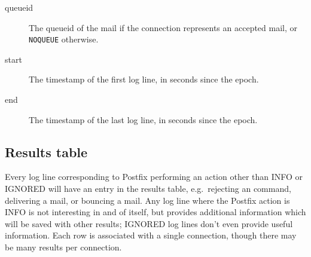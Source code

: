 \documentclass[a4paper,12pt,draft]{article}
\begin{document}
\begin{description}
    \item [queueid] The queueid of the mail if the connection represents an
        accepted mail, or \texttt{NOQUEUE} otherwise.

    \item [start] The timestamp of the first log line, in seconds since the
        epoch.

    \item [end] The timestamp of the last log line, in seconds since the
        epoch.

\end{description}

\subsection{Results table}

\label{results table}

Every log line corresponding to Postfix performing an action other than
INFO or IGNORED will have an entry in the results table, e.g.\ rejecting an
\SMTP{} command, delivering a mail, or bouncing a mail.  Any log line where
the Postfix action is INFO is not interesting in and of itself, but
provides additional information which will be saved with other results;
IGNORED log lines don't even provide useful information.  Each row is
associated with a single connection, though there may be many results per
connection.
\end{document}
